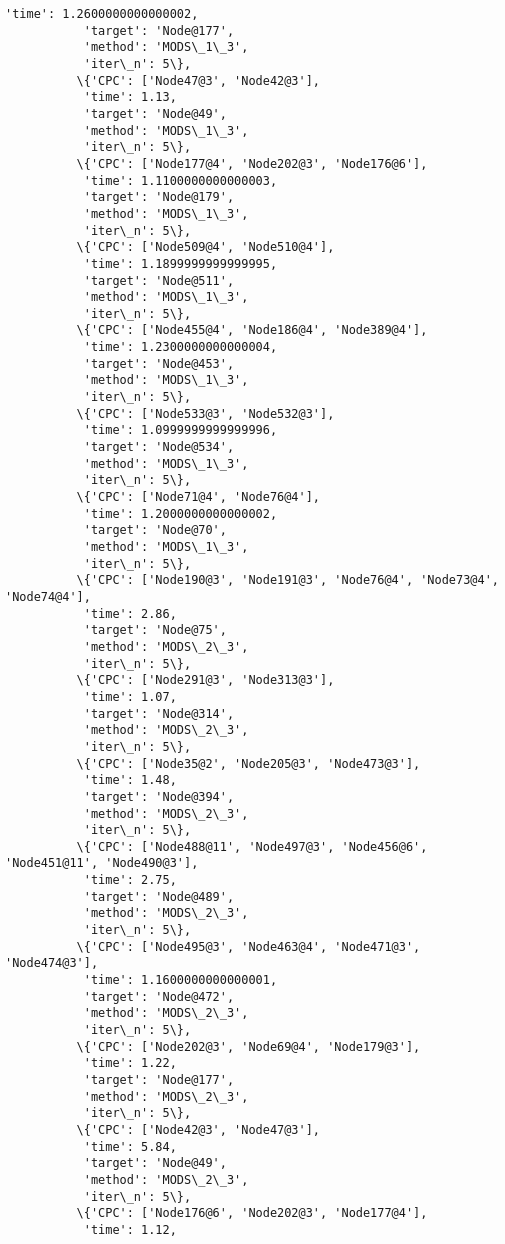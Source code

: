 \documentclass[11pt]{article}
\begin{document}
\begin{Verbatim}[commandchars=\\\{\}]
           'time': 1.2600000000000002,
           'target': 'Node@177',
           'method': 'MODS\_1\_3',
           'iter\_n': 5\},
          \{'CPC': ['Node47@3', 'Node42@3'],
           'time': 1.13,
           'target': 'Node@49',
           'method': 'MODS\_1\_3',
           'iter\_n': 5\},
          \{'CPC': ['Node177@4', 'Node202@3', 'Node176@6'],
           'time': 1.1100000000000003,
           'target': 'Node@179',
           'method': 'MODS\_1\_3',
           'iter\_n': 5\},
          \{'CPC': ['Node509@4', 'Node510@4'],
           'time': 1.1899999999999995,
           'target': 'Node@511',
           'method': 'MODS\_1\_3',
           'iter\_n': 5\},
          \{'CPC': ['Node455@4', 'Node186@4', 'Node389@4'],
           'time': 1.2300000000000004,
           'target': 'Node@453',
           'method': 'MODS\_1\_3',
           'iter\_n': 5\},
          \{'CPC': ['Node533@3', 'Node532@3'],
           'time': 1.0999999999999996,
           'target': 'Node@534',
           'method': 'MODS\_1\_3',
           'iter\_n': 5\},
          \{'CPC': ['Node71@4', 'Node76@4'],
           'time': 1.2000000000000002,
           'target': 'Node@70',
           'method': 'MODS\_1\_3',
           'iter\_n': 5\},
          \{'CPC': ['Node190@3', 'Node191@3', 'Node76@4', 'Node73@4', 'Node74@4'],
           'time': 2.86,
           'target': 'Node@75',
           'method': 'MODS\_2\_3',
           'iter\_n': 5\},
          \{'CPC': ['Node291@3', 'Node313@3'],
           'time': 1.07,
           'target': 'Node@314',
           'method': 'MODS\_2\_3',
           'iter\_n': 5\},
          \{'CPC': ['Node35@2', 'Node205@3', 'Node473@3'],
           'time': 1.48,
           'target': 'Node@394',
           'method': 'MODS\_2\_3',
           'iter\_n': 5\},
          \{'CPC': ['Node488@11', 'Node497@3', 'Node456@6', 'Node451@11', 'Node490@3'],
           'time': 2.75,
           'target': 'Node@489',
           'method': 'MODS\_2\_3',
           'iter\_n': 5\},
          \{'CPC': ['Node495@3', 'Node463@4', 'Node471@3', 'Node474@3'],
           'time': 1.1600000000000001,
           'target': 'Node@472',
           'method': 'MODS\_2\_3',
           'iter\_n': 5\},
          \{'CPC': ['Node202@3', 'Node69@4', 'Node179@3'],
           'time': 1.22,
           'target': 'Node@177',
           'method': 'MODS\_2\_3',
           'iter\_n': 5\},
          \{'CPC': ['Node42@3', 'Node47@3'],
           'time': 5.84,
           'target': 'Node@49',
           'method': 'MODS\_2\_3',
           'iter\_n': 5\},
          \{'CPC': ['Node176@6', 'Node202@3', 'Node177@4'],
           'time': 1.12,

\end{Verbatim}
\end{document}
